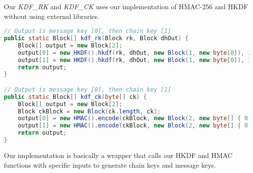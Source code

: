 Our \textit{KDF\_RK} and \textit{KDF\_CK} uses our implementation of HMAC-256 and HKDF without using external libraries.
\begin{lstlisting}[language=Java]
// Output is message key [0], then chain key [1]
public static Block[] kdf_rk(Block rk, Block dhOut) {
    Block[] output = new Block[2];
    output[0] = new HKDF().hkdf(rk, dhOut, new Block(1, new byte[0]), 32);
    output[1] = new HKDF().hkdf(rk, dhOut, new Block(1, new byte[0]), 32);
    return output;
}

// Output is message key [0], then chain key [1]
public static Block[] kdf_ck(byte[] ck) {
    Block[] output = new Block[2];
    Block ckBlock = new Block(ck.length, ck);
    output[0] = new HMAC().encode(ckBlock, new Block(2, new byte[] { 0, 1 })); // message
    output[1] = new HMAC().encode(ckBlock, new Block(2, new byte[] { 0, 2 })); // key
    return output;
}
\end{lstlisting}
Our implementation is basically a wrapper that calls our HKDF and HMAC functions with specific inputs to generate chain keys and message keys.
